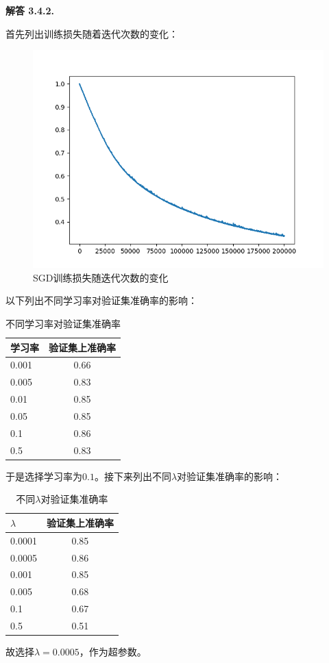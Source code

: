 \documentclass[12pt, a4paper, oneside]{ctexart}
\newenvironment{solution}[1]{\par\noindent\textbf{解答 #1. }\par}{\par}
\begin{document}
\begin{solution}{3.4.2}
    首先列出训练损失随着迭代次数的变化：
    \begin{figure}
        \centering
        \caption{SGD训练损失随迭代次数的变化}
        \includegraphics[width=.7\textwidth]{pic/Figure_8.png}
    \end{figure}
    以下列出不同学习率对验证集准确率的影响：
    \begin{table}[h!]
        \begin{center}
          \caption{不同学习率对验证集准确率}
          \begin{tabular}{l|c} %
            \textbf{学习率} & \textbf{验证集上准确率} \\
            \hline
            0.001 & 0.66\\
            0.005 & 0.83\\
            0.01 & 0.85\\
            0.05 & 0.85\\
            0.1 & 0.86\\
            0.5 & 0.83\\
          \end{tabular}
        \end{center}
    \end{table}
    于是选择学习率为$0.1$。接下来列出不同$\lambda$对验证集准确率的影响：
    \begin{table}[h!]
    \begin{center}
        \caption{不同$\lambda$对验证集准确率}
          \begin{tabular}{l|c} %
            \textbf{$\lambda$} & \textbf{验证集上准确率} \\
            \hline
            0.0001 & 0.85\\
            0.0005 & 0.86\\
            0.001 & 0.85\\
            0.005 & 0.68\\
            0.1 & 0.67\\
            0.5 & 0.51\\
          \end{tabular}
        \end{center}
    \end{table}
    故选择$\lambda = 0.0005$，作为超参数。
\end{solution}
\end{document}
